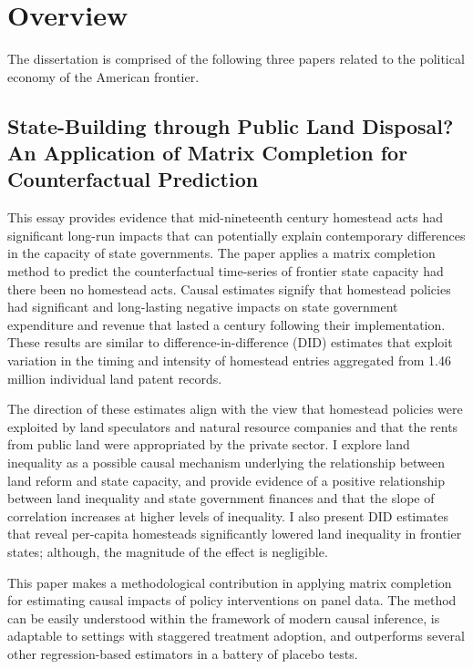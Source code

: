 \section{Overview}

The dissertation is comprised of the following three papers related to the political economy of the American frontier. 

\subsection{State-Building through Public Land Disposal? An Application of Matrix Completion for Counterfactual Prediction}
This essay provides evidence that mid-nineteenth century homestead acts had significant long-run impacts that can potentially explain contemporary differences in the capacity of state governments. The paper applies a matrix completion method to predict the counterfactual time-series of frontier state capacity had there been no homestead acts. Causal estimates signify that homestead policies had significant and long-lasting negative impacts on state government expenditure and revenue that lasted a century following their implementation. These results are similar to difference-in-difference (DID) estimates that exploit variation in the timing and intensity of homestead entries aggregated from 1.46 million individual land patent records.

The direction of these estimates align with the view that homestead policies were exploited by land speculators and natural resource companies and that the rents from public land were appropriated by the private sector. I explore land inequality as a possible causal mechanism underlying the relationship between land reform and state capacity, and provide evidence of a positive relationship between land inequality and state government finances and that the slope of correlation increases at higher levels of inequality. I also present DID estimates that reveal per-capita homesteads significantly lowered land inequality in frontier states; although, the magnitude of the effect is negligible. 

This paper makes a methodological contribution in applying matrix completion for estimating causal impacts of policy interventions on panel data. The method can be easily understood within the framework of modern causal inference, is adaptable to settings with staggered treatment adoption, and outperforms several other regression-based estimators in a battery of placebo tests.

